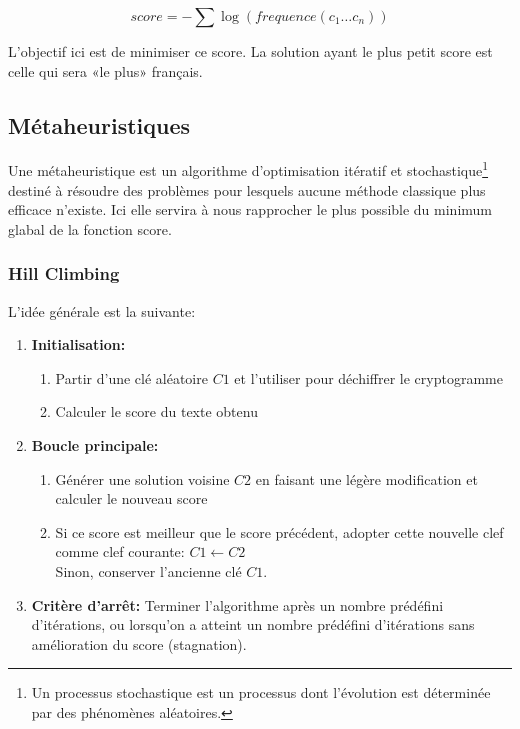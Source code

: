 \documentclass[a4paper]{article}
\begin{document}
\[
score = - \sum \log(frequence(c_1 \ldots c_n))
\]

L’objectif ici est de minimiser ce score. La solution ayant le plus petit score est celle qui sera «le plus» français.

\subsection{Métaheuristiques}

Une métaheuristique est un algorithme d’optimisation itératif et stochastique\footnote{Un processus stochastique est un processus dont l’évolution est déterminée par des phénomènes aléatoires.} destiné à résoudre des problèmes pour lesquels aucune méthode classique plus efficace n'existe. Ici elle servira à nous rapprocher le plus possible du minimum glabal de la fonction score.

\subsubsection{Hill Climbing}

L’idée générale est la suivante:
\begin{enumerate}
    \item \textbf{Initialisation:}
    \begin{enumerate}
        \item Partir d'une clé aléatoire $C1$ et l'utiliser pour déchiffrer le cryptogramme
        \item Calculer le score du texte obtenu
    \end{enumerate}
    \item \textbf{Boucle principale:}
    \begin{enumerate}[label= (\alph*)]
        \item \label{item:modification} Générer une solution voisine $C2$ en faisant une légère modification et calculer le nouveau score
        \item Si ce score est meilleur que le score précédent, adopter cette nouvelle clef comme clef courante: $C1 \leftarrow C2$\\
              Sinon, conserver l’ancienne clé $C1$.
    \end{enumerate}
    \item \textbf{Critère d'arrêt:} Terminer l'algorithme après un nombre prédéfini d'itérations, ou lorsqu'on a atteint un nombre prédéfini d'itérations sans amélioration du score (stagnation).
\end{enumerate}
\end{document}
